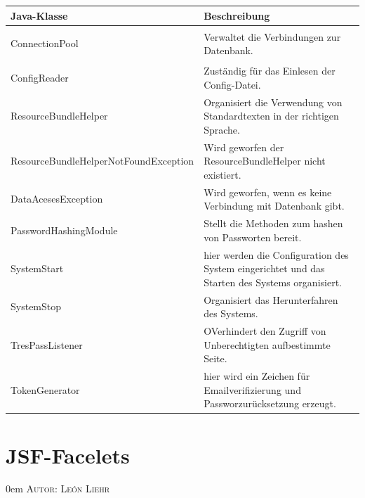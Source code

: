 \documentclass{article}
\makeatletter
\newcommand{\sectionauthor}[1]{
	{\parindent 0em \large \scshape Autor: #1 \par \nobreak \vspace*{1em}}
	\@afterheading
}
\makeatother
\begin{document}
        
  \begin{center}
    \begin{table}
        \begin{tabular} { |p{}|p{}| }
              \hline
            Java-Klasse & Beschreibung  \\
           \hline\hline
            \hypertarget{ConnectionPool}{ConnectionPool} & Verwaltet die Verbindungen zur Datenbank. \\
            \hline
            ConfigReader& Zuständig  für das Einlesen der Config-Datei. \\
             \hline
            ResourceBundleHelper & Organisiert die Verwendung von Standardtexten in
            der richtigen Sprache.\\

            \hline ResourceBundleHelperNotFoundException & Wird geworfen der ResourceBundleHelper nicht existiert. \\
             \hline
            DataAcesesException & Wird geworfen,  wenn es keine Verbindung mit Datenbank gibt. \\
            \hline
            PasswordHashingModule & Stellt die Methoden zum hashen  von Passworten bereit.\\
            \hline
            SystemStart & hier werden die Configuration des System eingerichtet und das Starten des Systems organisiert.\\
            \hline
            SystemStop & Organisiert das Herunterfahren des Systems.\\
             \hline
            \hypertarget{PhaseListener}{TresPassListener} & OVerhindert den Zugriff von Unberechtigten aufbestimmte Seite.\\
            \hline
            TokenGenerator & hier wird ein Zeichen für Emailverifizierung und Passworzurücksetzung erzeugt.\\
           \hline
        \end{tabular}
        \end{table}
        \end{center}
       









\section{JSF-Facelets}
\sectionauthor{León Liehr}
\hypertarget{Facelets}{}
\end{document}

